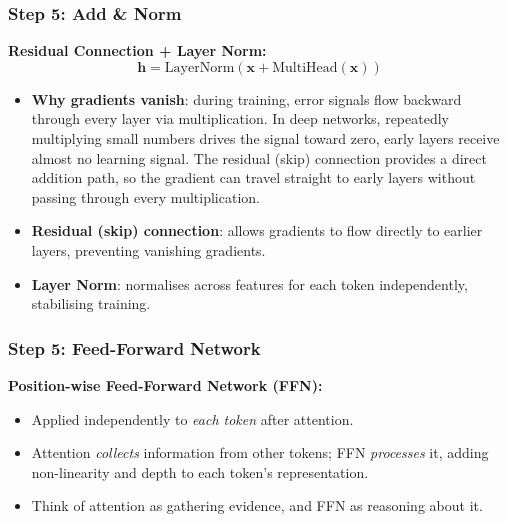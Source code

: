 \begin{frame}[fragile]\frametitle{Step 5: Add \& Norm}
\textbf{Residual Connection + Layer Norm:}
\[
  \mathbf{h} = \text{LayerNorm}(\mathbf{x} + \text{MultiHead}(\mathbf{x}))
\]
\begin{itemize}
\item \textbf{Why gradients vanish}: during training, error signals
  flow backward through every layer via multiplication. In deep
  networks, repeatedly multiplying small numbers drives the signal
  toward zero, early layers receive almost no learning signal.
  The residual (skip) connection provides a direct addition path,
  so the gradient can travel straight to early layers without
  passing through every multiplication.
\item \textbf{Residual (skip) connection}: allows gradients to flow directly to earlier layers, preventing vanishing gradients.
\item \textbf{Layer Norm}: normalises across features for each token independently, stabilising training.
\end{itemize}

\end{frame}

\begin{frame}[fragile]\frametitle{Step 5:  Feed-Forward Network}

\textbf{Position-wise Feed-Forward Network (FFN):}
\begin{itemize}
\item Applied independently to \emph{each token} after attention.
\item Attention \emph{collects} information from other tokens; FFN \emph{processes} it,  adding non-linearity and depth to each token's representation.
\item Think of attention as gathering evidence, and FFN as reasoning about it.
\end{itemize}
\end{frame}


